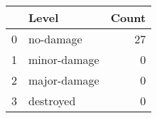 \begin{tabular}{llr}
\toprule
 & Level & Count \\
\midrule
0 & no-damage & 27 \\
1 & minor-damage & 0 \\
2 & major-damage & 0 \\
3 & destroyed & 0 \\
\bottomrule
\end{tabular}
